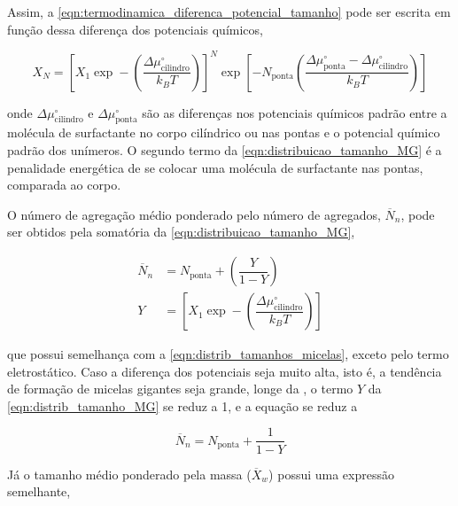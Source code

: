 		Assim, a \autoref{eqn:termodinamica_diferenca_potencial_tamanho} pode ser escrita em função dessa diferença dos potenciais químicos, \cite{Giant_Micelles}
		
		\begin{equation}
			X_N = \left[ X_1 \exp - \left( \dfrac{\Delta \mu_\mathrm{cilindro}^\circ}{k_B T} \right)  \right]^N \exp \left[ -N_\mathrm{ponta} \left( \dfrac{\Delta \mu_\mathrm{ponta}^\circ - \Delta \mu_\mathrm{cilindro}^\circ}{k_BT} \right)  \right]
			\label{eqn:distribuicao_tamanho_MG}
		\end{equation}
		
		\noindent onde \(\Delta \mu_\mathrm{cilindro}^\circ\) e \(\Delta \mu_\mathrm{ponta}^\circ\) são as diferenças nos potenciais químicos padrão entre a molécula de surfactante no corpo cilíndrico ou nas pontas e o potencial químico padrão dos unímeros. O segundo termo da \autoref{eqn:distribuicao_tamanho_MG} é a penalidade energética de se colocar uma molécula de surfactante nas pontas, comparada ao corpo.
		
		O número de agregação médio ponderado pelo número de agregados, \(\overline{N}_n\), pode ser obtidos pela somatória da \autoref{eqn:distribuicao_tamanho_MG}, \cite{Giant_Micelles}
		
		\begin{subequations}
			\begin{align}
			\overline{N}_n &= N_\mathrm{ponta} + \left( \dfrac{Y}{1 - Y} \right )  \\
			Y  &= \left[ X_1 \exp - \left( \dfrac{\Delta \mu_\mathrm{cilindro}^\circ}{k_B T} \right) \right]
			\end{align}
			\label{eqn:distrib_tamanho_MG}
		\end{subequations} 
				
		\noindent que possui semelhança com a \autoref{eqn:distrib_tamanhos_micelas}, exceto pelo termo eletrostático. Caso a diferença dos potenciais seja muito alta, isto é, a tendência de formação de micelas gigantes seja grande, longe da \cmc, o termo \(Y\) da \autoref{eqn:distrib_tamanho_MG} se reduz a 1, e a equação se reduz a \cite{Giant_Micelles}
		
		\begin{equation}
			\overline{N}_n = N_\mathrm{ponta} + \dfrac{1}{1 - Y}
			\label{eqn:distrib_tamanho_MG_reduzida}
		\end{equation}
		
		Já o tamanho médio ponderado pela massa (\(\overline{X}_w\)) possui uma expressão semelhante, \cite{Giant_Micelles}
		
